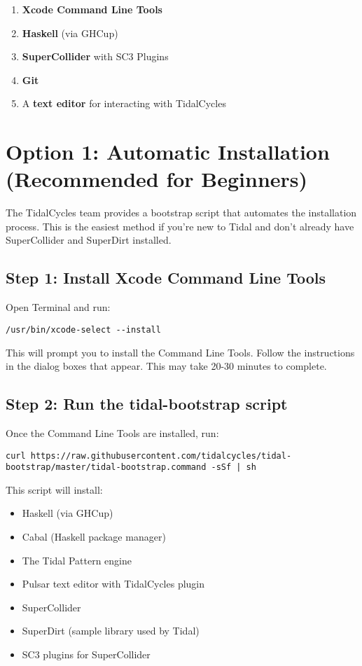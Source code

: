 \documentclass[11pt,a4paper]{article}
\begin{document}
\begin{enumerate}
    \item \textbf{Xcode Command Line Tools}
    \item \textbf{Haskell} (via GHCup)
    \item \textbf{SuperCollider} with SC3 Plugins
    \item \textbf{Git}
    \item A \textbf{text editor} for interacting with TidalCycles
\end{enumerate}

\section{Option 1: Automatic Installation (Recommended for Beginners)}

The TidalCycles team provides a bootstrap script that automates the installation process. This is the easiest method if you're new to Tidal and don't already have SuperCollider and SuperDirt installed.

\subsection{Step 1: Install Xcode Command Line Tools}

Open Terminal and run:
\begin{lstlisting}[style=bash]
/usr/bin/xcode-select --install
\end{lstlisting}

This will prompt you to install the Command Line Tools. Follow the instructions in the dialog boxes that appear. This may take 20-30 minutes to complete.

\subsection{Step 2: Run the tidal-bootstrap script}

Once the Command Line Tools are installed, run:
\begin{lstlisting}[style=bash]
curl https://raw.githubusercontent.com/tidalcycles/tidal-bootstrap/master/tidal-bootstrap.command -sSf | sh
\end{lstlisting}

This script will install:
\begin{itemize}
    \item Haskell (via GHCup)
    \item Cabal (Haskell package manager)
    \item The Tidal Pattern engine
    \item Pulsar text editor with TidalCycles plugin
    \item SuperCollider
    \item SuperDirt (sample library used by Tidal)
    \item SC3 plugins for SuperCollider
\end{itemize}
\end{document}
